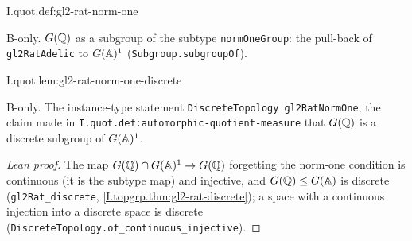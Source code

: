 \begin{definition}[$G(\Q)$ inside $G(\A)^1$]
\bonly
{}
\end{definition}
\begin{tfformal}{I.quot.def:gl2-rat-norm-one}
\begin{tffidelity}
B-only. $G(\Q)$ as a subgroup of the subtype \texttt{normOneGroup}: the pull-back of \texttt{gl2RatAdelic} to $G(\A)^1$ (\texttt{Subgroup.subgroupOf}).
\end{tffidelity}
\end{tfformal}

\begin{lemma}[$G(\Q)$ is discrete in $G(\A)^1$]
\bonly
{}
\end{lemma}
\begin{tfformal}{I.quot.lem:gl2-rat-norm-one-discrete}
\begin{tffidelity}
B-only. The instance-type statement \texttt{DiscreteTopology gl2RatNormOne}, the claim made in \texttt{I.quot.def:automorphic-quotient-measure} that $G(\Q)$ is a discrete subgroup of $G(\A)^1$.
\end{tffidelity}
\end{tfformal}
\begin{proof}[Lean proof]
The map $G(\mathbb{Q})\cap G(\mathbb{A})^1\to G(\mathbb{Q})$ forgetting the norm-one condition is continuous (it is the subtype map) and injective, and $G(\mathbb{Q})\le G(\mathbb{A})$ is discrete (\texttt{gl2Rat\_discrete}, \cref{I.topgrp.thm:gl2-rat-discrete}); a space with a continuous injection into a discrete space is discrete (\texttt{DiscreteTopology.of\_continuous\_injective}).
\end{proof}
